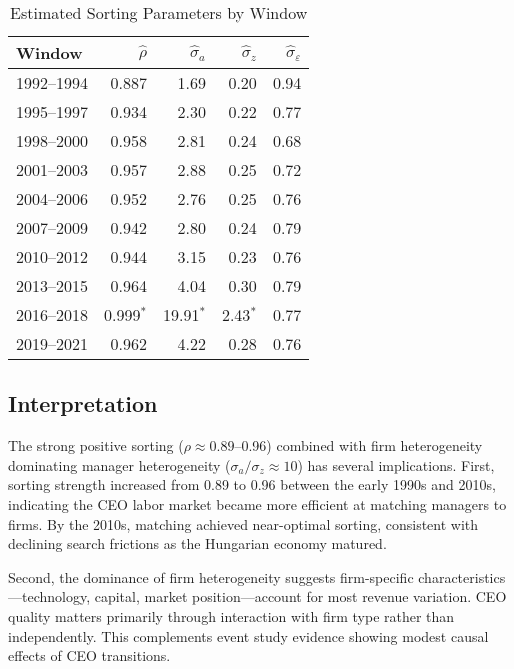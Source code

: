\documentclass[9pt,twocolumn,twoside]{pnas-new}
\begin{document}
\begin{table}[t]
\centering
\caption{Estimated Sorting Parameters by Window}
\label{tab:estimates}
\begin{tabular}{lrrrr}
\toprule
Window & $\widehat\rho$ & $\widehat\sigma_a$ & $\widehat\sigma_z$ & $\widehat\sigma_\varepsilon$ \\
\midrule
1992--1994 & 0.887 & 1.69 & 0.20 & 0.94 \\
1995--1997 & 0.934 & 2.30 & 0.22 & 0.77 \\
1998--2000 & 0.958 & 2.81 & 0.24 & 0.68 \\
2001--2003 & 0.957 & 2.88 & 0.25 & 0.72 \\
2004--2006 & 0.952 & 2.76 & 0.25 & 0.76 \\
2007--2009 & 0.942 & 2.80 & 0.24 & 0.79 \\
2010--2012 & 0.944 & 3.15 & 0.23 & 0.76 \\
2013--2015 & 0.964 & 4.04 & 0.30 & 0.79 \\
2016--2018 & 0.999$^*$ & 19.91$^*$ & 2.43$^*$ & 0.77 \\
2019--2021 & 0.962 & 4.22 & 0.28 & 0.76 \\
\bottomrule
\end{tabular}

\end{table}

\subsection*{Interpretation}
The strong positive sorting ($\rho \approx 0.89$--0.96) combined with firm heterogeneity dominating manager heterogeneity ($\sigma_a/\sigma_z \approx 10$) has several implications. First, sorting strength increased from 0.89 to 0.96 between the early 1990s and 2010s, indicating the CEO labor market became more efficient at matching managers to firms. By the 2010s, matching achieved near-optimal sorting, consistent with declining search frictions as the Hungarian economy matured.

Second, the dominance of firm heterogeneity suggests firm-specific characteristics---technology, capital, market position---account for most revenue variation. CEO quality matters primarily through interaction with firm type rather than independently. This complements event study evidence showing modest causal effects of CEO transitions.
\end{document}
